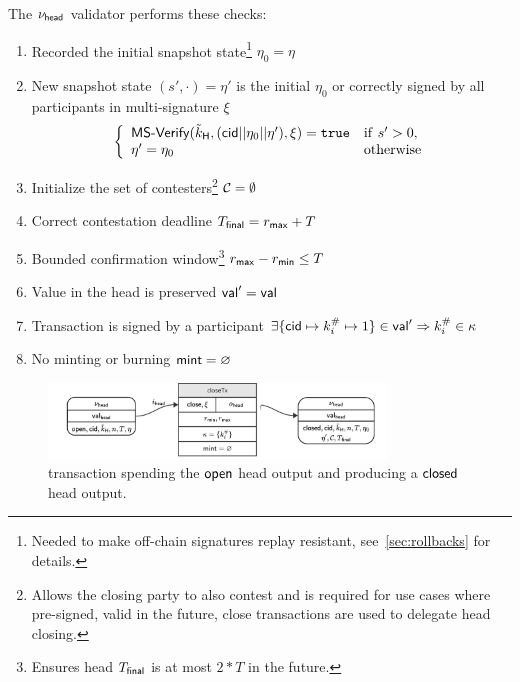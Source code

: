 \begin{samepage}
	\noindent The $\nu_\mathsf{head}$ validator performs these checks:
	\begin{enumerate}
		\item Recorded the initial snapshot state\footnote{Needed to make off-chain signatures replay resistant, see~\ref{sec:rollbacks} for details.} $\eta_0 = \eta$
		\item New snapshot state $(s', \cdot) = \eta'$ is the initial $\eta_{0}$
		      or correctly signed by all participants in multi-signature $\xi$ \\
		      \[
			      \left\{\begin{array}{ll}
				      \mathsf{MS\textsf{-}{}Verify}(\tilde{k}_{\mathsf{H}},(\mathsf{cid} || \eta_{0} || \eta'),\xi) = \mathtt{true} & \mathrm{if} ~ s' > 0, \\
				      \eta' = \eta_{0}                                              & \mathrm{otherwise}
			      \end{array}\right.
		      \]
		\item Initialize the set of contesters\footnote{Allows the closing party
			      to also contest and is required for use cases where pre-signed, valid in
			      the future, close transactions are used to delegate head closing.}
		      $\mathcal{C} = \emptyset$
		\item Correct contestation deadline $T_{\mathsf{final}} = r_{\mathsf{max}} + T$ 
		\item Bounded confirmation window\footnote{Ensures head $T_{\mathsf{final}}$ is at most
			      $2*T$ in the future.} $r_{\mathsf{max}} - r_{\mathsf{min}} \leq T$
		\item Value in the head is preserved $\mathsf{val}' = \mathsf{val}$
		\item Transaction is signed by a participant $\exists \{\mathsf{cid} \mapsto k^{\#}_{i} \mapsto 1\} \in \mathsf{val}' \Rightarrow k^{\#}_{i} \in \kappa$
		\item No minting or burning $\mathsf{mint} = \varnothing$
	\end{enumerate}
\end{samepage}

\begin{figure}[h]
	\centering
	\includegraphics[width=0.8\textwidth]{figures/closeTx.pdf}
	\caption{\mtxClose{} transaction spending the $\mathsf{open}$ head output and producing a $\mathsf{closed}$ head output.}\label{fig:closeTx}
\end{figure}

